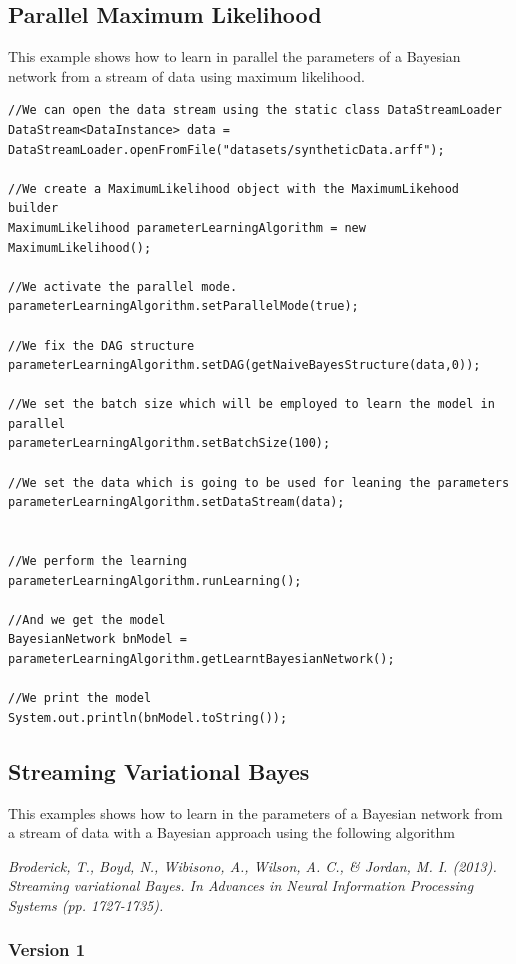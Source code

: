 \subsection{Parallel Maximum Likelihood}

This example shows how to learn in parallel the parameters of a Bayesian network from a stream of data using maximum likelihood.
\begin{lstlisting}
//We can open the data stream using the static class DataStreamLoader
DataStream<DataInstance> data = DataStreamLoader.openFromFile("datasets/syntheticData.arff");

//We create a MaximumLikelihood object with the MaximumLikehood builder
MaximumLikelihood parameterLearningAlgorithm = new MaximumLikelihood();

//We activate the parallel mode.
parameterLearningAlgorithm.setParallelMode(true);

//We fix the DAG structure
parameterLearningAlgorithm.setDAG(getNaiveBayesStructure(data,0));

//We set the batch size which will be employed to learn the model in parallel
parameterLearningAlgorithm.setBatchSize(100);

//We set the data which is going to be used for leaning the parameters
parameterLearningAlgorithm.setDataStream(data);


//We perform the learning
parameterLearningAlgorithm.runLearning();

//And we get the model
BayesianNetwork bnModel = parameterLearningAlgorithm.getLearntBayesianNetwork();

//We print the model
System.out.println(bnModel.toString());
\end{lstlisting}

\subsection{Streaming Variational Bayes}

This examples shows how to learn in the parameters of a Bayesian network from a stream of data with a Bayesian
approach using the following algorithm

\textit{Broderick, T., Boyd, N., Wibisono, A., Wilson, A. C., \& Jordan, M. I. (2013). Streaming variational Bayes. 
In Advances in Neural Information Processing Systems (pp. 1727-1735).
}

\subsubsection*{Version 1}

